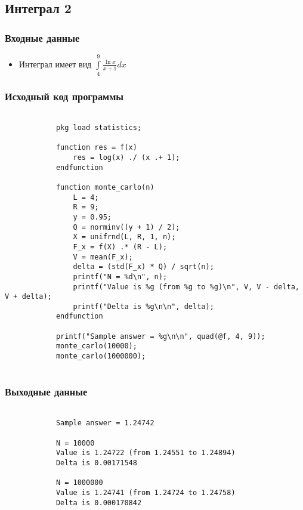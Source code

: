 \documentclass{article}
\begin{document}
    \subsection{Интеграл 2}
        \subsubsection{Входные данные}
            \begin{itemize}
                \item Интеграл имеет вид ${\displaystyle \int\limits_{4}^{9} \frac{\ln{x}}{x + 1} dx}$
            \end{itemize}
        \subsubsection{Исходный код программы}
        \begin{minipage}{\linewidth}
            \begin{verbatim}
            
            pkg load statistics;

            function res = f(x)
                res = log(x) ./ (x .+ 1);
            endfunction

            function monte_carlo(n)
                L = 4;
                R = 9;
                y = 0.95;
                Q = norminv((y + 1) / 2);
                X = unifrnd(L, R, 1, n);
                F_x = f(X) .* (R - L);
                V = mean(F_x);
                delta = (std(F_x) * Q) / sqrt(n);
                printf("N = %d\n", n);
                printf("Value is %g (from %g to %g)\n", V, V - delta, V + delta);
                printf("Delta is %g\n\n", delta); 
            endfunction

            printf("Sample answer = %g\n\n", quad(@f, 4, 9));
            monte_carlo(10000);
            monte_carlo(1000000);
            
            \end{verbatim}
        \end{minipage}
        \subsubsection{Выходные данные}
        \begin{minipage}{\linewidth}
            \begin{verbatim}

            Sample answer = 1.24742

            N = 10000
            Value is 1.24722 (from 1.24551 to 1.24894)
            Delta is 0.00171548

            N = 1000000
            Value is 1.24741 (from 1.24724 to 1.24758)
            Delta is 0.000170842

            \end{verbatim}
        \end{minipage}
\end{document}
